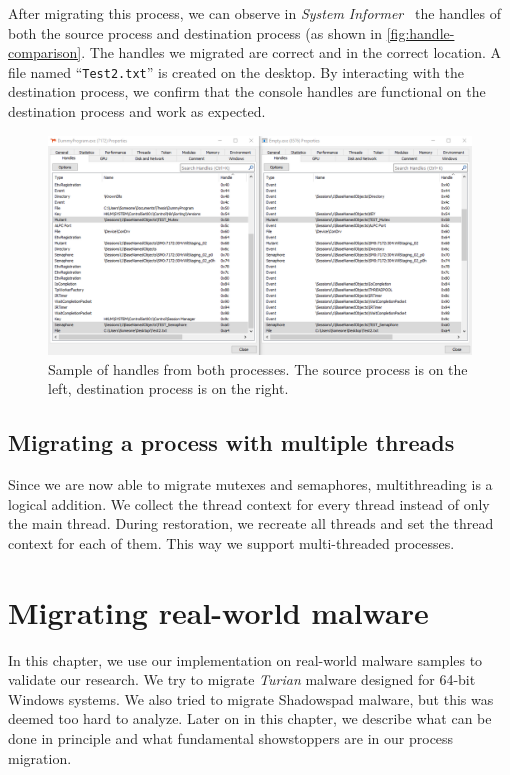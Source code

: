 \documentclass[a4paper, 11pt, english]{report}
\begin{document}
After migrating this process, we can observe in \textit{System Informer}~\cite{system-informer} the handles of both the source process and destination process (as shown in \autoref{fig:handle-comparison}. The handles we migrated are correct and in the correct location. A file named ``\texttt{Test2.txt}'' is created on the desktop. By interacting with the destination process, we confirm that the console handles are functional on the destination process and work as expected.

\clearpage %

\begin{figure}[h]
	
	\centerline{\includegraphics[width=1.2\textwidth]{images/handle-comparison-2.png}}
	\caption{Sample of handles from both processes. The source process is on the left, destination process is on the right.}
	\label{fig:handle-comparison}
\end{figure}

\section{Migrating a process with multiple threads}
\label{sec:multithreading}
Since we are now able to migrate mutexes and semaphores, multithreading is a logical addition.
We collect the thread context for every thread instead of only the main thread. During restoration, we recreate all threads and set the thread context for each of them. This way we support multi-threaded processes.


\chapter{Migrating real-world malware}
\label{ch:real-world}
In this chapter, we use our implementation on real-world malware samples to validate our research.
We try to migrate \textit{Turian} malware designed for 64-bit Windows systems. We also tried to migrate Shadowspad malware, but this was deemed too hard to analyze. Later on in this chapter, we describe what can be done in principle and what fundamental showstoppers are in our process migration.
\end{document}
